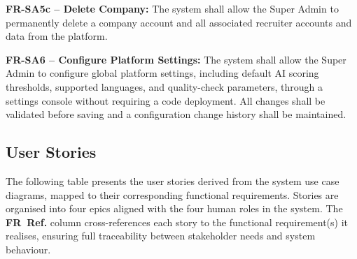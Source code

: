 \begin{outline}
    \3 \textbf{FR-SA5c -- Delete Company:}
    The system shall allow the Super Admin to permanently delete a company account and all
    associated recruiter accounts and data from the platform.

  \2 \textbf{FR-SA6 -- Configure Platform Settings:}
  The system shall allow the Super Admin to configure global platform settings, including
  default AI scoring thresholds, supported languages, and quality-check parameters, through
  a settings console without requiring a code deployment. All changes shall be validated
  before saving and a configuration change history shall be maintained.

\end{outline}

\subsection{User Stories}
\label{sec:user-stories}

The following table presents the user stories derived from the system use case diagrams,
mapped to their corresponding functional requirements. Stories are organised into four epics
aligned with the four human roles in the system. The \textbf{FR~Ref.} column
cross-references each story to the functional requirement(s) it realises, ensuring full
traceability between stakeholder needs and system behaviour.


\newcommand{\High}{\colorbox{nhHighBg}{\textcolor{nhHighFg}{\textbf{\footnotesize High}}}}
\newcommand{\Med}{\colorbox{nhMedBg}{\textcolor{nhMedFg}{\textbf{\footnotesize Med}}}}
\newcommand{\Low}{\colorbox{nhLowBg}{\textcolor{nhLowFg}{\textbf{\footnotesize Low}}}}


